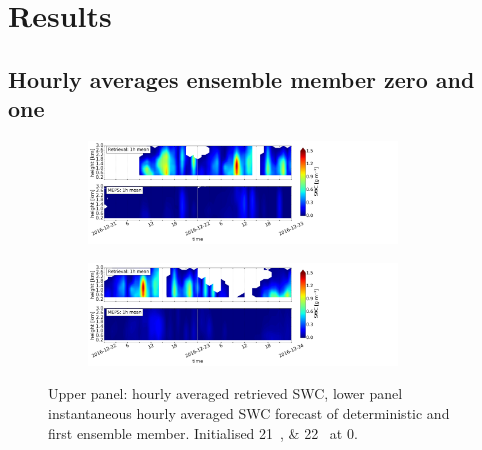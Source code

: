 \chapter{Results}
\section{Hourly averages ensemble member zero and one}%
\label{app:EM1h}

\begin{figure}[H]%
		\centering
		\begin{subfigure}[t]{\textwidth}
			\centering
			\includegraphics[trim={0.cm 0.8cm 19.cm 0.5cm},clip,width=0.9\textwidth]{./fig_vert_SWC_1h/20161221}
			\caption{}\label{fig:SWC1h:21}
		\end{subfigure}
		\begin{subfigure}[t]{\textwidth}
   		 \centering
    	\includegraphics[trim={0.cm 0.8cm 19.cm 0.5cm},clip,width=0.9\textwidth]{./fig_vert_SWC_1h/20161222}
		\caption{}\label{fig:SWC1h:22}
    	\end{subfigure}
       \caption{Upper panel: hourly averaged retrieved SWC, lower panel instantaneous hourly averaged SWC forecast of deterministic and first ensemble member. Initialised \SIlist{21;22}{\dec} at \SI{0}{\UTC}. }\label{fig:SWC_1h}
 \end{figure}
